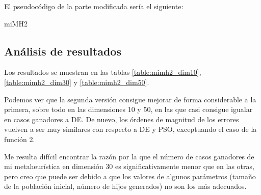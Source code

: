 \documentclass[10pt,a4paper]{article}
\begin{document}
El pseudocódigo de la parte modificada sería el siguiente:

\begin{algorithm}[H]
	\caption{miMH2}
\end{algorithm}

\subsection{Análisis de resultados}

Los resultados se muestran en las tablas \ref{table:mimh2_dim10}, \ref{table:mimh2_dim30} y \ref{table:mimh2_dim50}.

Podemos ver que la segunda versión consigue mejorar de forma considerable a la primera, sobre todo en las dimensiones 10 y 50, en las que casi consigue igualar en casos ganadores a DE. De nuevo, los órdenes de magnitud de los errores vuelven a ser muy similares con respecto a DE y PSO, exceptuando el caso de la función 2.

Me resulta difícil encontrar la razón por la que el número de casos ganadores de mi metaheurística en dimensión 30 es significativamente menor que en las otras, pero creo que puede ser debido a que los valores de algunos parámetros (tamaño de la población inicial, número de hijos generados) no son los más adecuados.
\end{document}
